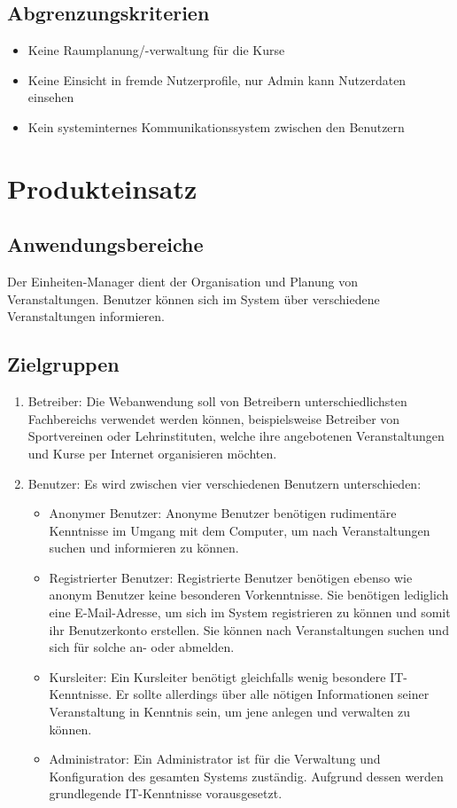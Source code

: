 \documentclass[a4paper]{scrreprt}
\begin{document}
	\section{Abgrenzungskriterien}
     		\begin{itemize}
	     		\item Keine Raumplanung/-verwaltung für die Kurse
	     		\item Keine Einsicht in fremde Nutzerprofile, nur Admin kann Nutzerdaten einsehen
	     		\item Kein systeminternes Kommunikationssystem zwischen den Benutzern
     		\end{itemize}
        
  
\chapter{Produkteinsatz}
    \section{Anwendungsbereiche}
		 Der \gls{Einheiten}-Manager dient der Organisation und Planung von Veranstaltungen. Benutzer können sich im System über verschiedene Veranstaltungen informieren.   
     
	\section{Zielgruppen}
		 \begin{enumerate}
		 	\item Betreiber: Die Webanwendung soll von Betreibern unterschiedlichsten Fachbereichs verwendet werden können, beispielsweise Betreiber von Sportvereinen oder Lehrinstituten, welche ihre angebotenen Veranstaltungen und Kurse per Internet organisieren möchten.
		 	\item Benutzer: Es wird zwischen vier verschiedenen Benutzern unterschieden:
		 	\begin{itemize}
		 		\item Anonymer Benutzer: Anonyme Benutzer benötigen rudimentäre Kenntnisse im Umgang mit dem Computer, um nach 	Veranstaltungen suchen und informieren zu können.
		 		\item Registrierter Benutzer: Registrierte Benutzer benötigen ebenso wie anonym Benutzer keine besonderen Vorkenntnisse. Sie benötigen lediglich eine E-Mail-Adresse, um sich im System registrieren zu können und somit ihr Benutzerkonto erstellen. Sie können nach Veranstaltungen suchen und sich für solche an- oder abmelden.
		 		\item Kursleiter: Ein Kursleiter benötigt gleichfalls wenig besondere IT-Kenntnisse. Er sollte allerdings über alle nötigen Informationen seiner Veranstaltung in Kenntnis sein, um jene anlegen und verwalten zu können.
		 		\item Administrator: Ein Administrator ist für die Verwaltung und \gls{Konfiguration} des gesamten Systems zuständig. Aufgrund dessen werden grundlegende IT-Kenntnisse vorausgesetzt.
		 	\end{itemize}	
		 \end{enumerate}  
        
\end{document}
